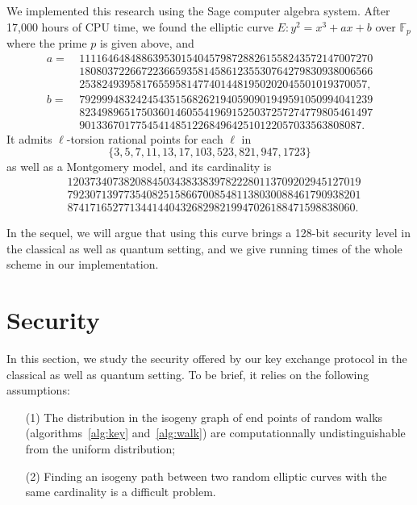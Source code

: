 \documentclass{article}
\newcommand{\F}{\mathbb{F}}
\theoremstyle{definition}
\begin{document}
We implemented this research using the Sage computer algebra system.
After 17,000 hours of CPU time, we found the elliptic curve
$
	E : y^2 = x^3 + ax + b
$
over $\F_p$ where the prime $p$ is given above, and
\[
\begin{aligned}
a =\ & 1111646484886395301540457987288261558243572147007270 \\ 
& 1808037226672236659358145861235530764279830938006566 \\
& 253824939581765595814774014481950202045501019370057,\\
b =\ & 7929994832424543515682621940590901949591050994041239 \\
& 8234989651750360146055419691525037257274779805461497 \\ 
& 90133670177545414851226849642510122057033563808087.
\end{aligned}
\]
It admits $\ell$-torsion rational points for each $\ell$ in
\[
  \{3, 5, 7, 11, 13, 17, 103, 523, 821, 947, 1723\}
\]
as well as a Montgomery model, and its cardinality is
\[
\begin{aligned}
& 1203734073820884503438338397822280113709202945127019 \\ 
& 7923071397735408251586670085481138030088461790938201 \\
& 874171652771344144043268298219947026188471598838060.
\end{aligned}
\]

In the sequel, we will argue that using this curve brings a 128-bit security level
in the classical as well as quantum setting, and we give running times of the whole
scheme in our implementation.

\section{Security}
\label{sec:sec}

In this section, we study the security offered by our key exchange protocol
in the classical as well as quantum setting. To be brief, it relies on
the following assumptions:

\begin{itemize}
\item[(1)] The distribution in the isogeny graph of
end points of random walks (algorithms~\ref{alg:key} and~\ref{alg:walk})
are computationnally undistinguishable from the uniform distribution;
\item[(2)] Finding an isogeny path between two random elliptic curves with the
same cardinality is a difficult problem.
\end{itemize}
\end{document}
